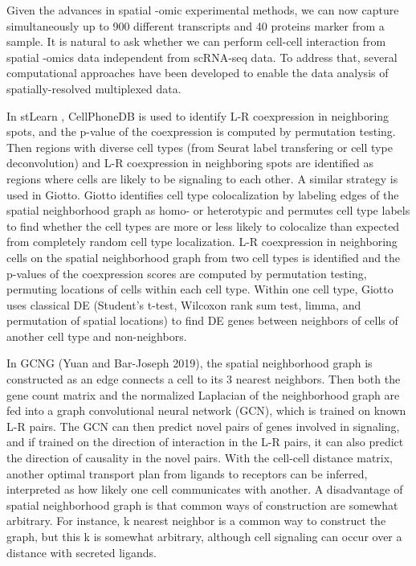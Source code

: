 Given the advances in spatial -omic experimental methods, we can now capture simultaneously up to 900 different transcripts and 40 proteins marker from a sample. It is natural to ask whether we can perform cell-cell interaction from spatial -omics data independent from scRNA-seq data. To address that,  several computational approaches have been developed to enable the data analysis of spatially-resolved multiplexed data. 

In stLearn , CellPhoneDB is used to identify L-R coexpression in neighboring spots, and the p-value of the coexpression is computed by permutation testing. Then regions with diverse cell types (from Seurat label transfering or cell type deconvolution) and L-R coexpression in neighboring spots are identified as regions where cells are likely to be signaling to each other. A similar strategy is used in Giotto. Giotto identifies cell type colocalization by labeling edges of the spatial neighborhood graph as homo- or heterotypic and permutes cell type labels to find whether the cell types are more or less likely to colocalize than expected from completely random cell type localization. L-R coexpression in neighboring cells on the spatial neighborhood graph from two cell types is identified and the p-values of the coexpression scores are computed by permutation testing, permuting locations of cells within each cell type. Within one cell type, Giotto uses classical DE (Student’s t-test, Wilcoxon rank sum test, limma, and permutation of spatial locations) to find DE genes between neighbors of cells of another cell type and non-neighbors.

In GCNG (Yuan and Bar-Joseph 2019), the spatial neighborhood graph is constructed as an edge connects a cell to its 3 nearest neighbors. Then both the gene count matrix and the normalized Laplacian of the neighborhood graph are fed into a graph convolutional neural network (GCN), which is trained on known L-R pairs. The GCN can then predict novel pairs of genes involved in signaling, and if trained on the direction of interaction in the L-R pairs, it can also predict the direction of causality in the novel pairs. With the cell-cell distance matrix, another optimal transport plan from ligands to receptors can be inferred, interpreted as how likely one cell communicates with another. A disadvantage of spatial neighborhood graph is that common ways of construction are somewhat arbitrary. For instance, k nearest neighbor is a common way to construct the graph, but this k is somewhat arbitrary, although cell signaling can occur over a distance with secreted ligands.

